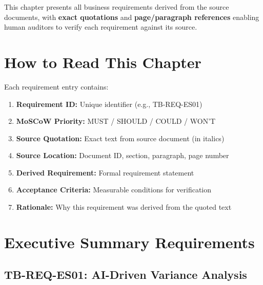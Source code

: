 \documentclass[11pt,a4paper,twoside]{report}
\begin{document}
This chapter presents all business requirements derived from the source documents,
with \textbf{exact quotations} and \textbf{page/paragraph references} enabling
human auditors to verify each requirement against its source.

\section{How to Read This Chapter}

Each requirement entry contains:

\begin{tcolorbox}[colback=blue!5,colframe=blue!75!black,title=Requirement Entry Format]
\begin{enumerate}[leftmargin=*]
\item \textbf{Requirement ID:} Unique identifier (e.g., TB-REQ-ES01)
\item \textbf{MoSCoW Priority:} MUST / SHOULD / COULD / WON'T
\item \textbf{Source Quotation:} Exact text from source document (in italics)
\item \textbf{Source Location:} Document ID, section, paragraph, page number
\item \textbf{Derived Requirement:} Formal requirement statement
\item \textbf{Acceptance Criteria:} Measurable conditions for verification
\item \textbf{Rationale:} Why this requirement was derived from the quoted text
\end{enumerate}
\end{tcolorbox}

\section{Executive Summary Requirements}
\label{sec:req-executive}

\subsection{TB-REQ-ES01: AI-Driven Variance Analysis}
\label{req:tb-req-es01}
\end{document}
